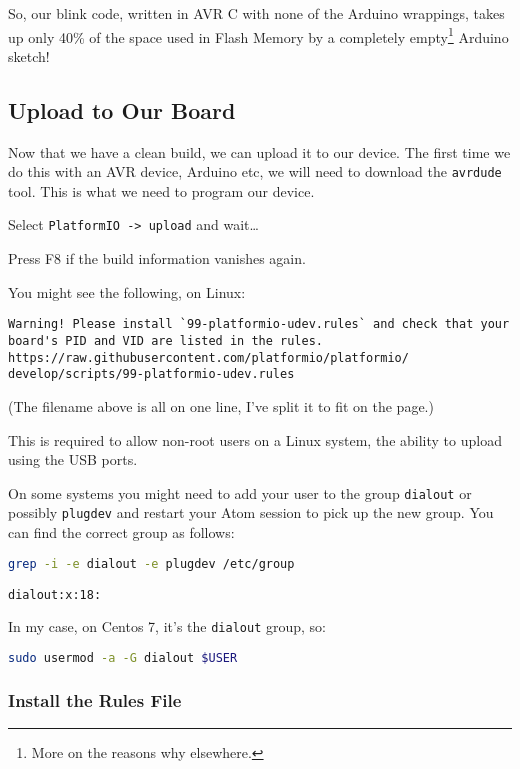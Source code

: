So, our blink code, written in AVR C with none of the Arduino wrappings,
takes up only 40\% of the space used in Flash Memory by a completely
empty\footnote{More on the reasons why elsewhere.} Arduino sketch!

\subsection{Upload to Our Board}\label{upload-to-our-board}

Now that we have a clean build, we can upload it to our device. The
first time we do this with an AVR device, Arduino etc, we will need to
download the \lstinline!avrdude! tool. This is what we need to program
our device.

Select \lstinline!PlatformIO -> upload! and wait\ldots{}

Press F8 if the build information vanishes again.

You might see the following, on Linux:

\begin{lstlisting}
Warning! Please install `99-platformio-udev.rules` and check that your 
board's PID and VID are listed in the rules.
https://raw.githubusercontent.com/platformio/platformio/
develop/scripts/99-platformio-udev.rules
\end{lstlisting}

(The filename above is all on one line, I've split it to fit on the page.)

This is required to allow non-root users on a Linux system, the ability
to upload using the USB ports. 

On some systems you might need to add your 
user to the group \lstinline!dialout! or possibly \lstinline!plugdev! and 
restart your Atom session to pick up the new group. You can find the correct group
as follows:

\begin{lstlisting}[language=bash]
grep -i -e dialout -e plugdev /etc/group

dialout:x:18:
\end{lstlisting}

In my case, on Centos 7, it's the \lstinline!dialout! group, so:

\begin{lstlisting}[language=bash]
sudo usermod -a -G dialout $USER
\end{lstlisting}


\subsubsection{Install the Rules File}\label{install-the-rules-file}

